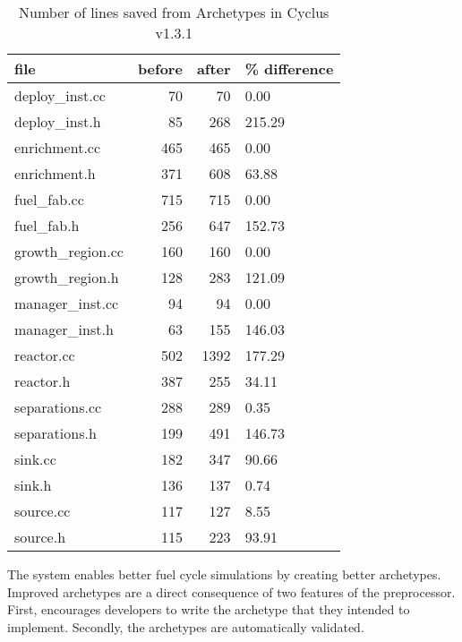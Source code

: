 \begin{table}
\caption{ Number of lines saved from Archetypes in Cyclus v1.3.1}
\label{lines}
\centering
\begin{tabular}{|lrrl|}
\toprule
file &  before &  after & \% difference \\
\hline
deploy\_inst.cc   &      70 &     70 &         0.00 \\
\hline
deploy\_inst.h    &      85 &    268 &       215.29 \\
\hline
enrichment.cc    &     465 &    465 &         0.00 \\
\hline
enrichment.h     &     371 &    608 &        63.88 \\
\hline
fuel\_fab.cc      &     715 &    715 &         0.00 \\
\hline
fuel\_fab.h       &     256 &    647 &       152.73 \\
\hline
growth\_region.cc &     160 &    160 &         0.00 \\
\hline
growth\_region.h  &     128 &    283 &       121.09 \\
\hline
manager\_inst.cc  &      94 &     94 &         0.00 \\
\hline
manager\_inst.h   &      63 &    155 &       146.03 \\
\hline
reactor.cc       &     502 &   1392 &       177.29 \\
\hline
reactor.h        &     387 &    255 &        34.11 \\
\hline
separations.cc   &     288 &    289 &         0.35 \\
\hline
separations.h    &     199 &    491 &       146.73 \\
\hline
sink.cc          &     182 &    347 &        90.66 \\
\hline
sink.h           &     136 &    137 &         0.74 \\
\hline
source.cc        &     117 &    127 &         8.55 \\
\hline
source.h         &     115 &    223 &        93.91 \\
\bottomrule
\end{tabular}
\end{table}


The \cyclus system enables better fuel cycle simulations by creating better
archetypes.  Improved archetypes are a direct consequence of two features of the preprocessor. First,
\cyclus encourages developers to write the archetype
that they intended to implement. Secondly, the archetypes are automatically
validated.

